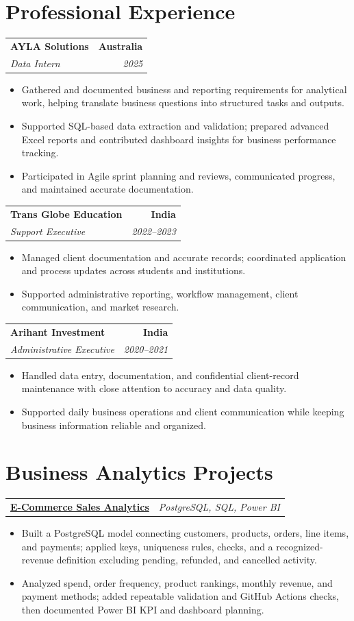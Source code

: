 \documentclass[letterpaper,10pt]{article}
\makeatletter
\newcommand{\role}[4]{%
  \begin{tabularx}{\textwidth}{@{}Xr@{}}
    \textbf{#1} & \textbf{#2} \\
    \textit{#3} & \textit{#4}
  \end{tabularx}\vspace{-1pt}
}
\newcommand{\project}[2]{%
  \begin{tabularx}{\textwidth}{@{}Xr@{}}
    \textbf{#1} & \textit{#2}
  \end{tabularx}\vspace{-1pt}
}
\makeatother
\begin{document}
\section{Professional Experience}
\role{AYLA Solutions}{Australia}{Data Intern}{2025}
\begin{itemize}
  \item Gathered and documented business and reporting requirements for analytical work, helping translate business questions into structured tasks and outputs.
  \item Supported SQL-based data extraction and validation; prepared advanced Excel reports and contributed dashboard insights for business performance tracking.
  \item Participated in Agile sprint planning and reviews, communicated progress, and maintained accurate documentation.
\end{itemize}
\vspace{1pt}

\role{Trans Globe Education}{India}{Support Executive}{2022--2023}
\begin{itemize}
  \item Managed client documentation and accurate records; coordinated application and process updates across students and institutions.
  \item Supported administrative reporting, workflow management, client communication, and market research.
\end{itemize}
\vspace{1pt}

\role{Arihant Investment}{India}{Administrative Executive}{2020--2021}
\begin{itemize}
  \item Handled data entry, documentation, and confidential client-record maintenance with close attention to accuracy and data quality.
  \item Supported daily business operations and client communication while keeping business information reliable and organized.
\end{itemize}

\section{Business Analytics Projects}
\project{\href{https://github.com/jainalimehta/Ecommerce-Sales-Analytics}{E-Commerce Sales Analytics}}{PostgreSQL, SQL, Power BI}
\begin{itemize}
  \item Built a PostgreSQL model connecting customers, products, orders, line items, and payments; applied keys, uniqueness rules, checks, and a recognized-revenue definition excluding pending, refunded, and cancelled activity.
  \item Analyzed spend, order frequency, product rankings, monthly revenue, and payment methods; added repeatable validation and GitHub Actions checks, then documented Power BI KPI and dashboard planning.
\end{itemize}
\vspace{1pt}
\end{document}

